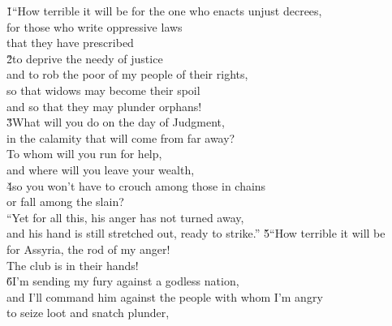 \begin{poetry}
\poeml {}
\v{1}``How terrible it will be for the one who enacts unjust decrees, \\
\poemll    for those who write oppressive laws \\
\poemll    that they have prescribed \\
\poeml \v{2}to deprive the needy of justice \\
\poemll    and to rob the poor of my people of their rights, \\
\poeml so that widows may become their spoil \\
\poemll    and so that they may plunder orphans! \\
\poeml \v{3}What will you do on the day of Judgment, \\
\poemll    in the calamity that will come from far away? \\
\poeml To whom will you run for help, \\
\poemll    and where will you leave your wealth, \\
\poeml \v{4}so you won't have to crouch among those in chains \\
\poemll    or fall among the slain? \\
\poeml ``Yet for all this, his anger has not turned away, \\
\poemll    and his hand is still stretched out, ready to strike.''
\poeml \v{5}``How terrible it will be \\
\poemll    for Assyria, the rod of my anger! \\
\poemlll       The club is in their hands! \\
\poeml \v{6}I'm sending my fury against a godless nation, \\
\poemll    and I'll command him against the people with whom I'm angry \\
\poeml to seize loot and snatch plunder, \\

\end{poetry}
